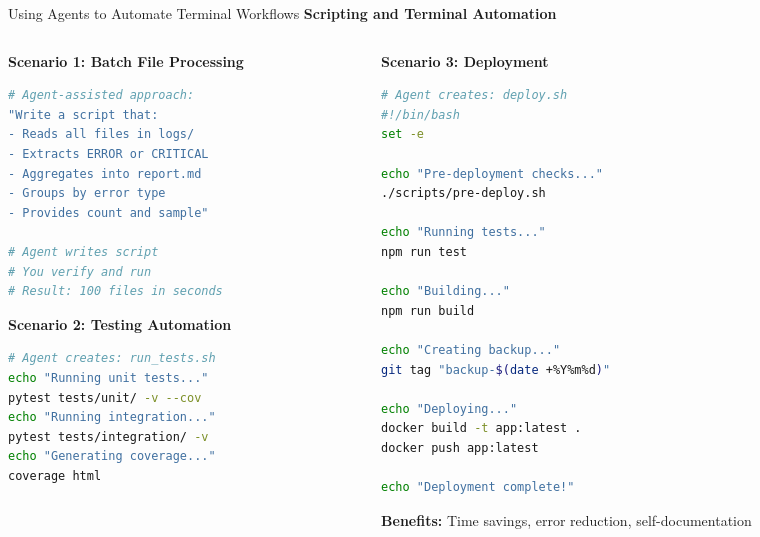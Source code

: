 \documentclass[aspectratio=169,11pt]{beamer}
\begin{document}
\begin{frame}[fragile]{Using Agents to Automate Terminal Workflows}
    \textbf{Scripting and Terminal Automation}

    \begin{columns}[T]
        \begin{column}{0.48\textwidth}
            \textbf{Scenario 1: Batch File Processing}
            \begin{lstlisting}[language=Bash]
# Agent-assisted approach:
"Write a script that:
- Reads all files in logs/
- Extracts ERROR or CRITICAL
- Aggregates into report.md
- Groups by error type
- Provides count and sample"

# Agent writes script
# You verify and run
# Result: 100 files in seconds
            \end{lstlisting}

            \textbf{Scenario 2: Testing Automation}
            \begin{lstlisting}[language=Bash]
# Agent creates: run_tests.sh
echo "Running unit tests..."
pytest tests/unit/ -v --cov
echo "Running integration..."
pytest tests/integration/ -v
echo "Generating coverage..."
coverage html
            \end{lstlisting}
        \end{column}
        \begin{column}{0.48\textwidth}
            \textbf{Scenario 3: Deployment}
            \begin{lstlisting}[language=Bash]
# Agent creates: deploy.sh
#!/bin/bash
set -e

echo "Pre-deployment checks..."
./scripts/pre-deploy.sh

echo "Running tests..."
npm run test

echo "Building..."
npm run build

echo "Creating backup..."
git tag "backup-$(date +%Y%m%d)"

echo "Deploying..."
docker build -t app:latest .
docker push app:latest

echo "Deployment complete!"
            \end{lstlisting}

            \textbf{Benefits:} Time savings, error reduction, self-documentation
        \end{column}
    \end{columns}
\end{frame}
\end{document}
